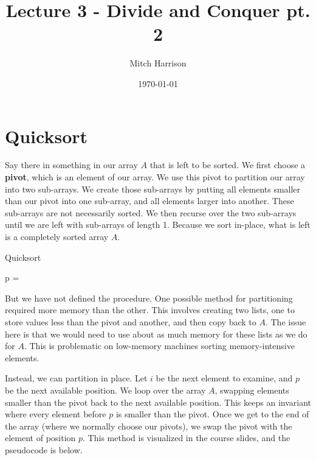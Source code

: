 \documentclass[titlepage, 12pt, leqno]{article}
\title{\Huge{Lecture 3 - Divide and Conquer pt. 2}}
\author{\large{Mitch Harrison}}
\date{\today}
\begin{document}
\setlength{\parskip}{1\baselineskip}
\setlength{\parindent}{15pt}
\maketitle
\tableofcontents
\newpage


\section{Quicksort}

Say there in something in our array $A$ that is left to be sorted. We first
choose a \textbf{pivot}, which is an element of our array. We use this pivot
to partition our array into two sub-arrays. We create those sub-arrays by
putting all elements smaller than our pivot into one sub-array, and all elements
larger into another. These sub-arrays are not necessarily sorted. We then
recurse over the two sub-arrays until we are left with sub-arrays of length
1. Because we sort in-place, what is left is a completely sorted array $A$.

\begin{algorithm}
\caption{Quicksort}
\begin{algorithmic}[1]
\State p = 
\State {} 
\State {} 
\EndIf
\EndProcedure 
\end{algorithmic}
\end{algorithm}

But we have not defined the  procedure. One possible method
for partitioning required more memory than the other. This involves creating
two lists, one to store values less than the pivot and another, and then copy
back to $A$. The issue here is that we would need to use about as much memory
for these lists as we do for $A$. This is problematic on low-memory machines
sorting memory-intensive elements.

Instead, we can partition in place. Let $i$ be the next element to examine, 
and $p$ be the next available position. We loop over the array $A$, swapping
elements smaller than the pivot back to the next available position. This keeps
an invariant where every element before $p$ is smaller than the pivot. Once we
get to the end of the array (where we normally choose our pivots), we swap
the pivot with the element of position $p$. This method is visualized in the
course slides, and the pseudocode is below.
\end{document}
